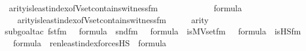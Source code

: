 \begin{isabellebody}
{\isafoldproof}%
%
\isadelimproof
\isanewline
%
\endisadelimproof
\isanewline
{}\isamarkupfalse%
\ arity{\isacharunderscore}{\kern0pt}is{\isacharunderscore}{\kern0pt}least{\isacharunderscore}{\kern0pt}index{\isacharunderscore}{\kern0pt}of{\isacharunderscore}{\kern0pt}Vset{\isacharunderscore}{\kern0pt}contains{\isacharunderscore}{\kern0pt}witness{\isacharunderscore}{\kern0pt}fm\ {\isacharcolon}{\kern0pt}\ \isanewline
\ \ \ {\isasymphi}\ \ \isanewline
\ \ \ {\isachardoublequoteopen}{\isasymphi}\ {\isasymin}\ formula{\isachardoublequoteclose}\isanewline
\ \ \ {\isachardoublequoteopen}arity{\isacharparenleft}{\kern0pt}is{\isacharunderscore}{\kern0pt}least{\isacharunderscore}{\kern0pt}index{\isacharunderscore}{\kern0pt}of{\isacharunderscore}{\kern0pt}Vset{\isacharunderscore}{\kern0pt}contains{\isacharunderscore}{\kern0pt}witness{\isacharunderscore}{\kern0pt}fm{\isacharparenleft}{\kern0pt}{\isasymphi}{\isacharparenright}{\kern0pt}{\isacharparenright}{\kern0pt}\ {\isasymle}\ {}\ {\isacharhash}{\kern0pt}{\isacharplus}{\kern0pt}\ {\isacharparenleft}{\kern0pt}{}\ {\isasymunion}\ arity{\isacharparenleft}{\kern0pt}{\isasymphi}{\isacharparenright}{\kern0pt}{\isacharparenright}{\kern0pt}{\isachardoublequoteclose}\ \isanewline
%
\isadelimproof
\isanewline
\ \ %
\endisadelimproof
%
\isatagproof
{}\isamarkupfalse%
{\isacharparenleft}{\kern0pt}subgoal{\isacharunderscore}{\kern0pt}tac\ {\isachardoublequoteopen}fst{\isacharunderscore}{\kern0pt}fm{\isacharparenleft}{\kern0pt}{}{\isacharcomma}{\kern0pt}\ {}{\isacharparenright}{\kern0pt}\ {\isasymin}\ formula\ {\isasymand}\ snd{\isacharunderscore}{\kern0pt}fm{\isacharparenleft}{\kern0pt}{}{\isacharcomma}{\kern0pt}\ {}{\isacharparenright}{\kern0pt}\ {\isasymin}\ formula\ {\isasymand}\ is{\isacharunderscore}{\kern0pt}MVset{\isacharunderscore}{\kern0pt}fm{\isacharparenleft}{\kern0pt}{}{\isacharcomma}{\kern0pt}\ {}{\isacharparenright}{\kern0pt}\ {\isasymin}\ formula\ {\isasymand}\ is{\isacharunderscore}{\kern0pt}HS{\isacharunderscore}{\kern0pt}fm{\isacharparenleft}{\kern0pt}{}{}{\isacharcomma}{\kern0pt}\ {}{\isacharparenright}{\kern0pt}\ {\isasymin}\ formula\ {\isasymand}\ ren{\isacharunderscore}{\kern0pt}least{\isacharunderscore}{\kern0pt}index{\isacharparenleft}{\kern0pt}forcesHS{\isacharparenleft}{\kern0pt}{\isasymphi}{\isacharparenright}{\kern0pt}{\isacharparenright}{\kern0pt}\ {\isasymin}\ formula{\isachardoublequoteclose}{\isacharparenright}{\kern0pt}\isanewline

\end{isabellebody}
